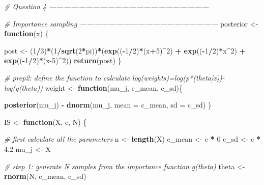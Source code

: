 \documentclass[
]{article}
\newenvironment{Shaded}{\begin{snugshade}}{\end{snugshade}}
\newcommand{\CommentTok}[1]{\textcolor[rgb]{0.56,0.35,0.01}{\textit{#1}}}
\newcommand{\ControlFlowTok}[1]{\textcolor[rgb]{0.13,0.29,0.53}{\textbf{#1}}}
\newcommand{\DataTypeTok}[1]{\textcolor[rgb]{0.13,0.29,0.53}{#1}}
\newcommand{\DecValTok}[1]{\textcolor[rgb]{0.00,0.00,0.81}{#1}}
\newcommand{\FloatTok}[1]{\textcolor[rgb]{0.00,0.00,0.81}{#1}}
\newcommand{\KeywordTok}[1]{\textcolor[rgb]{0.13,0.29,0.53}{\textbf{#1}}}
\newcommand{\NormalTok}[1]{#1}
\newcommand{\OperatorTok}[1]{\textcolor[rgb]{0.81,0.36,0.00}{\textbf{#1}}}
\newcommand{\StringTok}[1]{\textcolor[rgb]{0.31,0.60,0.02}{#1}}
\begin{document}
\begin{Shaded}
\begin{Highlighting}[]
{{{{\CommentTok{# Question 4 ------------------------------------------------------------------}


\CommentTok{# Importance sampling ---------------------------------------------------------}
\NormalTok{posterior <-}\StringTok{ }\ControlFlowTok{function}\NormalTok{(x) \{}

\NormalTok{  post <-}\StringTok{ }\NormalTok{(}\DecValTok{1}\OperatorTok{/}\DecValTok{3}\NormalTok{)}\OperatorTok{*}\NormalTok{(}\DecValTok{1}\OperatorTok{/}\KeywordTok{sqrt}\NormalTok{(}\DecValTok{2}\OperatorTok{*}\NormalTok{pi))}\OperatorTok{*}\NormalTok{(}\KeywordTok{exp}\NormalTok{((}\OperatorTok{-}\DecValTok{1}\OperatorTok{/}\DecValTok{2}\NormalTok{)}\OperatorTok{*}\NormalTok{(x}\OperatorTok{+}\DecValTok{5}\NormalTok{)}\OperatorTok{^}\DecValTok{2}\NormalTok{) }\OperatorTok{+}\StringTok{ }\KeywordTok{exp}\NormalTok{((}\OperatorTok{-}\DecValTok{1}\OperatorTok{/}\DecValTok{2}\NormalTok{)}\OperatorTok{*}\NormalTok{x}\OperatorTok{^}\DecValTok{2}\NormalTok{) }\OperatorTok{+}\StringTok{ }\KeywordTok{exp}\NormalTok{((}\OperatorTok{-}\DecValTok{1}\OperatorTok{/}\DecValTok{2}\NormalTok{)}\OperatorTok{*}\NormalTok{(x}\DecValTok{-5}\NormalTok{)}\OperatorTok{^}\DecValTok{2}\NormalTok{))}
  \KeywordTok{return}\NormalTok{(post)}
\NormalTok{\}}


 
\CommentTok{# prep2: define the function to calculate log(weights)=log(p*(theta|x))-log(g(theta))}
\NormalTok{weight <-}\StringTok{ }\ControlFlowTok{function}\NormalTok{(mu_j, c_mean, c_sd)\{}
   
    \KeywordTok{posterior}\NormalTok{(mu_j) }\OperatorTok{-}\StringTok{ }\KeywordTok{dnorm}\NormalTok{(mu_j, }\DataTypeTok{mean =}\NormalTok{ c_mean, }\DataTypeTok{sd =}\NormalTok{ c_sd)}
\NormalTok{\}}


\NormalTok{IS <-}\StringTok{ }\ControlFlowTok{function}\NormalTok{(X, c, N) \{}
 
    \CommentTok{# first calculate all the parameters }
\NormalTok{    n <-}\StringTok{ }\KeywordTok{length}\NormalTok{(X) }
\NormalTok{    c_mean <-}\StringTok{ }\NormalTok{c }\OperatorTok{*}\StringTok{ }\DecValTok{0}
\NormalTok{    c_sd <-}\StringTok{ }\NormalTok{c }\OperatorTok{*}\StringTok{ }\FloatTok{4.2}
\NormalTok{    mu_j <-}\StringTok{ }\NormalTok{X}
    
    \CommentTok{# step 1: generate N samples from the importance function g(theta)}
\NormalTok{    theta <-}\StringTok{ }\KeywordTok{rnorm}\NormalTok{(N, c_mean, c_sd)}
    
}}}}
\end{Highlighting}
\end{Shaded}
\end{document}
